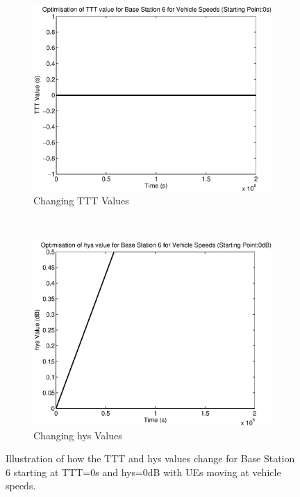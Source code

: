 \begin{figure}[H]
        \centering
        \begin{subfigure}[b]{0.49\textwidth}
                \includegraphics[width=\textwidth]{figures/graphs/vehlow/TTT6.eps}
                \caption{Changing TTT Values}
        \end{subfigure}%
        ~ %
        \begin{subfigure}[b]{0.49\textwidth}
                \includegraphics[width=\textwidth]{figures/graphs/vehlow/hys6.eps}
                \caption{Changing hys Values}
        \end{subfigure}
        \caption{Illustration of how the TTT and hys values change for Base Station 6 starting at TTT=0s and hys=0dB with UEs moving at vehicle speeds.}
\end{figure}
